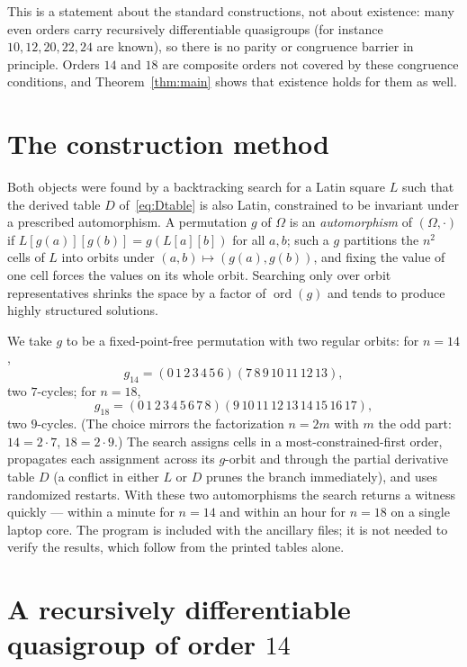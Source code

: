 \documentclass[11pt]{article}
\theoremstyle{definition}
\newcommand{\Om}{\Omega}
\DeclareMathOperator{\ord}{ord}
\begin{document}
This is a statement about the standard constructions, not about existence: many even
orders carry recursively differentiable quasigroups (for instance $10,12,20,22,24$ are
known), so there is no parity or congruence barrier in principle. Orders $14$ and $18$ are
composite orders not covered by these congruence conditions, and Theorem~\ref{thm:main}
shows that existence holds for them as well.

\section{The construction method}\label{sec:method}

Both objects were found by a backtracking search for a Latin square $L$ such that the
derived table $D$ of~\eqref{eq:Dtable} is also Latin, constrained to be invariant under a
prescribed automorphism. A permutation $g$ of $\Om$ is an \emph{automorphism} of
$(\Om,\cdot)$ if $L[g(a)][g(b)]=g(L[a][b])$ for all $a,b$; such a $g$ partitions the $n^2$
cells of $L$ into orbits under $(a,b)\mapsto(g(a),g(b))$, and fixing the value of one cell
forces the values on its whole orbit. Searching only over orbit representatives shrinks
the space by a factor of $\ord(g)$ and tends to produce highly structured solutions.

We take $g$ to be a fixed-point-free permutation with two regular orbits: for $n=14$,
\[
  g_{14}=(0\,1\,2\,3\,4\,5\,6)(7\,8\,9\,10\,11\,12\,13),
\]
two $7$-cycles; for $n=18$,
\[
  g_{18}=(0\,1\,2\,3\,4\,5\,6\,7\,8)(9\,10\,11\,12\,13\,14\,15\,16\,17),
\]
two $9$-cycles. (The choice mirrors the factorization $n=2m$ with $m$ the odd part:
$14=2\cdot7$, $18=2\cdot9$.) The search assigns cells in a most-constrained-first order,
propagates each assignment across its $g$-orbit and through the partial derivative table
$D$ (a conflict in either $L$ or $D$ prunes the branch immediately), and uses randomized
restarts. With these two automorphisms the search returns a witness quickly --- within a
minute for $n=14$ and within an hour for $n=18$ on a single laptop core. The program is
included with the ancillary files; it is not needed to verify the results, which follow
from the printed tables alone.

\section{\texorpdfstring{A recursively differentiable quasigroup of order $14$}
{A recursively differentiable quasigroup of order 14}}\label{sec:q14}
\end{document}
